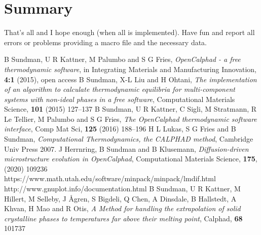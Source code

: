 \documentclass[11pt]{article}
\begin{document}

\hypertarget{Summary}{}
\section{Summary }

That's all and I hope enough (when all is implemented).  Have fun and
report all errors or problems providing a macro file and the necessary
data.

\begin{thebibliography}{77zzz}
 B Sundman, U R Kattner, M Palumbo and S G
  Fries, {\em OpenCalphad - a free thermodynamic software}, in
  Integrating Materials and Manufacturing Innovation, {\bf 4:1}
  (2015), open access
 B Sundman, X-L Liu and H Ohtani, {\em The
  implementation of an algorithm to calculate thermodynamic equilibria
  for multi-component systems with non-ideal phases in a free
  software}, Computational Materials Science, {\bf 101} (2015) 127--137
 B Sundman, U R Kattner, C Sigli, M Stratmann, R
  Le Tellier, M Palumbo and S G Fries, {\em The OpenCalphad
    thermodynamic software interface}, Comp Mat Sci, {\bf 125} (2016)
  188--196
 H L Lukas, S G Fries and B Sundman, {\em
  Computational Thermodynamics, the CALPHAD method}, Cambridge Univ
  Press 2007.
 J Herrnring, B Sundman and B Klusemann, {\em
  Diffusion-driven microstructure evolution in OpenCalphad},
  Computational Materials Science, {\bf 175}, (2020) 109236
  https://www.math.utah.edu/software/minpack/minpack/lmdif.html
 http://www.gnuplot.info/documentation.html
 B Sundman, U R Kattner, M Hillert, M Selleby, J
  {\AA}gren, S Bigdeli, Q Chen, A Dinsdale, B Hallstedt, A Khvan, H
  Mao and R Otis, {\em A Method for handling the extrapolation of
    solid crystalline phases to temperatures far above their melting
    point}, Calphad, {\bf 68} 101737
\end{thebibliography}
\end{document}
